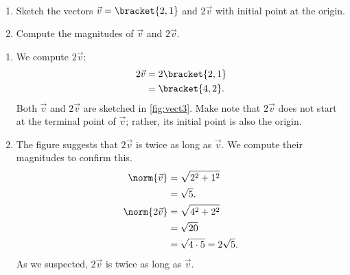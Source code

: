 \begin{example}\label{ex_vect3}
\mbox{}\\[-2\baselineskip]
\begin{enumerate}
\item	Sketch the vectors $\vec v =\bracket{2,1}$ and  $2\vec v$ with initial point at the origin. 
\item Compute the magnitudes of $\vec v$ and $2\vec v$.
\end{enumerate}
\solution
\begin{enumerate}
\item	We compute $2\vec v$:
\begin{align*}
	2\vec v &= 2\bracket{2,1}\\
	&=\bracket{4,2}.
\end{align*}
%
%
Both $\vec v$ and $2\vec v$ are sketched in \autoref{fig:vect3}. Make note that $2\vec v$ does not start at the terminal point of $\vec v$; rather, its initial point is also the origin. 
	
\item	The figure suggests that $2\vec v$ is twice as long as $\vec v$. We compute their magnitudes to confirm this.
\begin{align*}
	\norm{\vec v} &= \sqrt{2^2+1^2}\\
	&= \sqrt{5}.\\
	\norm{2\vec v}&=\sqrt{4^2+2^2} \\
	&= \sqrt{20}\\
	&= \sqrt{4\cdot 5} = 2\sqrt{5}.
\end{align*}
As we suspected, $2\vec v$ is twice as long as $\vec v$.
\end{enumerate}
\end{example}

